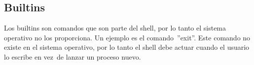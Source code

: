 \subsection{Builtins}
Los builtins son comandos que son parte del shell, por lo tanto el sistema operativo no los proporciona. Un ejemplo es el comando\
''exit''. Este comando no existe en el sistema operativo, por lo tanto el shell debe actuar cuando el usuario lo escribe en vez\
de lanzar un proceso nuevo.
